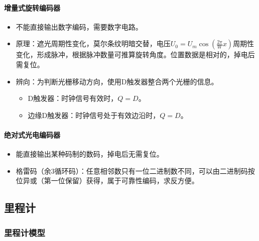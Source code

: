 \documentclass[
12pt, %
a4paper, 
oneside, %
headinclude,footinclude, %
]{scrartcl}
\begin{document}
\paragraph{增量式旋转编码器}
\begin{itemize}
\item 不能直接输出数字编码，需要数字电路。
\item 原理：遮光周期性变化，莫尔条纹明暗交替，电压$ U_0 = U_m \cos(\frac{2\pi}{W}x) $周期性变化，形成脉冲，根据脉冲数量可推算旋转角度。位置数据是相对的，掉电后需复位。
\item 辨向：为判断光栅移动方向，使用D触发器整合两个光栅的信息。
\begin{itemize}
\item D触发器：时钟信号有效时，$ Q = D $。
\item 边缘D触发器：时钟信号处于有效边沿时，$ Q = D $。
\end{itemize}
\end{itemize}
\paragraph{绝对式光电编码器}
\begin{itemize}
\item 能直接输出某种码制的数码，掉电后无需复位。
\item 格雷码（余$ 3 $循环码）：任意相邻数只有一位二进制数不同，可以由二进制码按位异或（第一位保留）获得，属于可靠性编码，求反方便。
\end{itemize}
\subsection[里程计]{里程计}
\subsubsection[里程计模型]{里程计模型}\label{sec:odometer}
\end{document}
